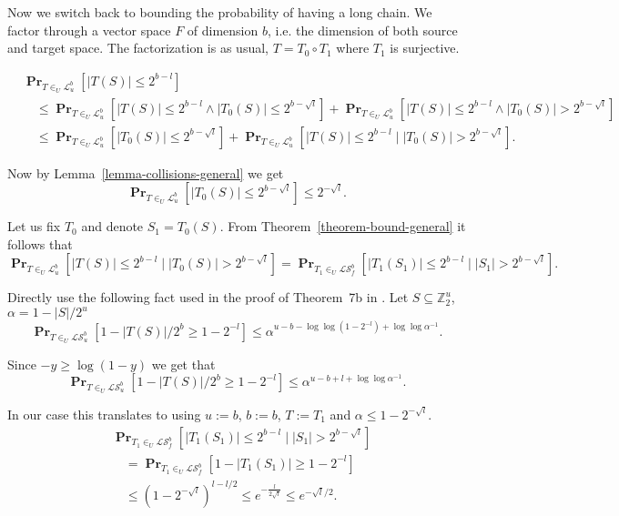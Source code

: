 \documentclass{article}
\newcommand{\vecspace}[2]{\mathbb{Z}_{#1}^{#2}}
\newcommand{\binvecspace}[1]{\vecspace{2}{#1}}
\newcommand{\linearmaps}[2]{\mathcal{L}_{#1}^{#2}}
\newcommand{\surjectivelinearmaps}[2]{\mathcal{LS}_{#1}^{#2}}
\newcommand{\probs}[2]{\operatorname{\mathbf{Pr}}_{{#1}}\left[{#2}\right]}
\begin{document}
Now we switch back to bounding the probability of having a long chain.
We factor through a vector space $F$ of dimension $b$, i.e. the dimension of both source and target space.
The factorization is as usual, $T = T_0 \circ T_1$ where $T_1$ is surjective.

\begin{align*}
& \probs{T \in_U \linearmaps{u}{b}}{|T(S)| \leq 2^{b - l}} \\
& \quad \leq \probs{T \in_U \linearmaps{u}{b}}{|T(S)| \leq 2^{b - l} \wedge |T_0(S)| \leq 2^{b - \sqrt{l}}} + \probs{T \in_U \linearmaps{u}{b}}{|T(S)| \leq 2^{b - l} \wedge |T_0(S)| > 2^{b - \sqrt{l}}} \\
& \quad \leq \probs{T \in_U \linearmaps{u}{b}}{|T_0(S)| \leq 2^{b - \sqrt{l}}} + \probs{T \in_U \linearmaps{u}{b}}{|T(S)| \leq 2^{b - l} \mid |T_0(S)| > 2^{b - \sqrt{l}}}.
\end{align*}

Now by Lemma~\ref{lemma-collisions-general} we get
\[
\probs{T \in_U \linearmaps{u}{b}}{|T_0(S)| \leq 2^{b - \sqrt{l}}} \leq 2^{-\sqrt{l}}.
\]

Let us fix $T_0$ and denote $S_1 = T_0(S)$. From Theorem~\ref{theorem-bound-general} it follows that 
\[
\probs{T \in_U \linearmaps{u}{b}}{|T(S)| \leq 2^{b - l} \mid |T_0(S)| > 2^{b - \sqrt{l}}} = 
\probs{T_1 \in_U \surjectivelinearmaps{f}{b}}{|T_1(S_1)| \leq 2^{b - l} \mid |S_1| > 2^{b - \sqrt{l}}}.
\]

Directly use the following fact used in the proof of Theorem~7b in \cite{alonetal}.
Let $S \subseteq \binvecspace{u}$, $\alpha = 1 - |S|/2^u$
\[
\probs{T \in_U \surjectivelinearmaps{u}{b}}{1 - |T(S)|/2^b \geq 1 - 2^{-l}} \leq \alpha^{u - b - \log \log \left(1 - 2^{-l}\right) + \log \log \alpha^{-1}}.
\]

Since $-y \geq \log (1 - y)$ we get that 
\[
\probs{T \in_U \surjectivelinearmaps{u}{b}}{1 - |T(S)|/2^b \geq 1 - 2^{-l}} \leq \alpha^{u - b + l + \log \log \alpha^{-1}}.
\]


In our case this translates to using $u := b$, $b := b$, $T := T_1$ and $\alpha \leq 1-2^{-\sqrt{l}}$.
\begin{align*}
& \probs{T_1 \in_U \surjectivelinearmaps{f}{b}}{|T_1(S_1)| \leq 2^{b - l} \mid |S_1| > 2^{b - \sqrt{l}}} \\
& \quad = \probs{T_1 \in_U \surjectivelinearmaps{f}{b}}{1 - |T_1(S_1)| \geq 1 - 2^{- l}} \\
& \quad \leq \left(1 - 2^{-\sqrt{l}}\right)^{l - l/2} \leq e^{-\frac{l}{2\sqrt{l}}} \leq e^{-\sqrt{l}/2}.
\end{align*}
\end{document}
